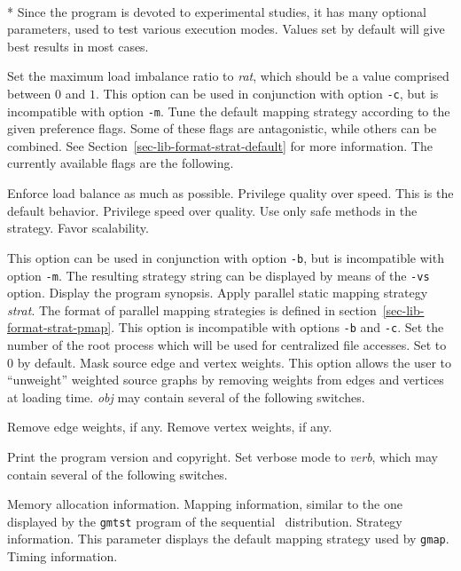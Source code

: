 \begin{itemize}
\progopt\\*
Since the program is devoted to experimental studies, it has many
optional parameters, used to test various execution modes. Values
set by default will give best results in most cases.
\begin{itemize}
\iteme[{\tt -b}{\it rat}]
Set the maximum load imbalance ratio to \textit{rat}, which should
be a value comprised between $0$ and $1$. This option can be used in
conjunction with option \texttt{-c}, but is incompatible with option
\texttt{-m}.
\iteme[{\tt -c}{\it flags}]
Tune the default mapping strategy according to the given preference
flags. Some of these flags are antagonistic, while others can be
combined. See Section~\ref{sec-lib-format-strat-default} for more
information. The currently available flags are the following.
\begin{itemize}
\iteme[{\tt b}]
Enforce load balance as much as possible.
\iteme[{\tt q}]
Privilege quality over speed. This is the default behavior.
\iteme[{\tt s}]
Privilege speed over quality.
\iteme[{\tt t}]
Use only safe methods in the strategy.
\iteme[{\tt x}]
Favor scalability.
\end{itemize}
This option can be used in conjunction with option \texttt{-b}, but is
incompatible with option \texttt{-m}.
The resulting strategy string can be displayed by means
of the {\tt -vs} option.
\iteme[{\tt -h}]
Display the program synopsis.
\iteme[{{\tt -m}{\it strat}}]
Apply parallel static mapping strategy {\it strat}. The format of parallel
mapping strategies is defined in section~\ref{sec-lib-format-strat-pmap}.
This option is incompatible with options \texttt{-b} and
\texttt{-c}.
\iteme[{\tt -r}{\it num}]
Set the number of the root process which will be used for centralized
file accesses. Set to $0$ by default.
\iteme[{\tt -s}{\it obj}]
Mask source edge and vertex weights. This option allows the user to
``unweight'' weighted source graphs by removing weights from edges and
vertices at loading time. {\it obj\/} may contain several of the following
switches.
\begin{itemize}
\iteme[{\tt e}]
Remove edge weights, if any.
\iteme[{\tt v}]
Remove vertex weights, if any.
\end{itemize}
\iteme[{\tt -V}]
Print the program version and copyright.
\iteme[{\tt -v}{\it verb}]
Set verbose mode to {\it verb}, which may contain several of the following
switches.
\begin{itemize}
\iteme[{\tt a}]
Memory allocation information.
\iteme[{\tt m}]
Mapping information, similar to the one displayed by the {\tt gmtst}
program of the sequential \scotch\ distribution.
\iteme[{\tt s}]
Strategy information. This parameter displays the default mapping
strategy used by {\tt gmap}.
\iteme[{\tt t}]
Timing information.
\end{itemize}
\end{itemize}
\end{itemize}

